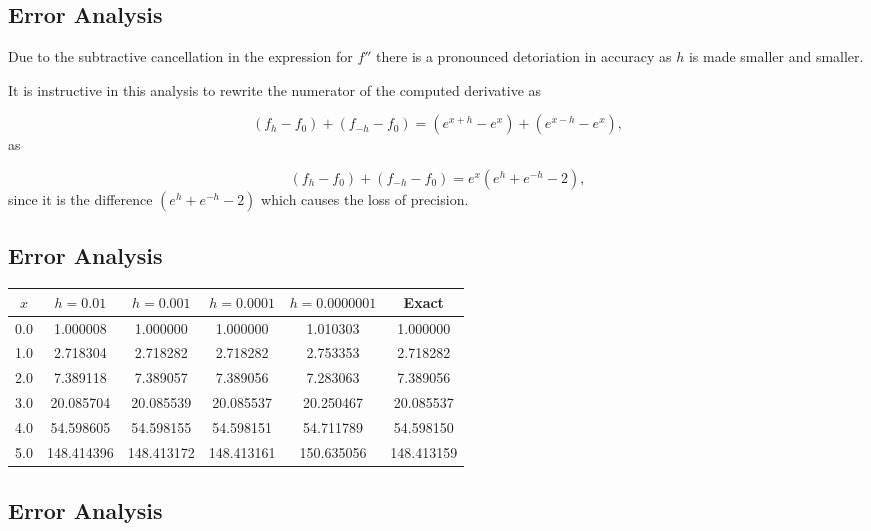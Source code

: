 \documentclass[%
oneside,                 %
final,                   %
10pt]{article}
\begin{document}
\subsection{Error Analysis}

\begin{block}{}
Due to the subtractive cancellation in the expression
for $f''$ there is a pronounced detoriation in accuracy as $h$ is made smaller
and smaller.

It is instructive in this analysis to rewrite the numerator of
the computed derivative as

\[
   (f_h -f_0) +(f_{-h}-f_0)=(e^{x+h}-e^{x}) + (e^{x-h}-e^{x}),
\]
as

\[
   (f_h -f_0) +(f_{-h}-f_0)=e^x(e^{h}+e^{-h}-2),
\]
since it is the difference $(e^{h}+e^{-h}-2)$ which causes
the loss of precision.
\end{block}

\subsection{Error Analysis}

\begin{block}{}


{\footnotesize
\begin{tabular}{cccccc}
\hline
\multicolumn{1}{c}{ $x$ } & \multicolumn{1}{c}{ $h=0.01$ } & \multicolumn{1}{c}{ $h=0.001$ } & \multicolumn{1}{c}{ $h=0.0001$ } & \multicolumn{1}{c}{ $h=0.0000001$ } & \multicolumn{1}{c}{ Exact } \\
\hline
0.0 & 1.000008   & 1.000000   & 1.000000   & 1.010303      & 1.000000   \\
1.0 & 2.718304   & 2.718282   & 2.718282   & 2.753353      & 2.718282   \\
2.0 & 7.389118   & 7.389057   & 7.389056   & 7.283063      & 7.389056   \\
3.0 & 20.085704  & 20.085539  & 20.085537  & 20.250467     & 20.085537  \\
4.0 & 54.598605  & 54.598155  & 54.598151  & 54.711789     & 54.598150  \\
5.0 & 148.414396 & 148.413172 & 148.413161 & 150.635056    & 148.413159 \\
\hline
\end{tabular}
}

\noindent
\end{block}

\subsection{Error Analysis}
\end{document}
